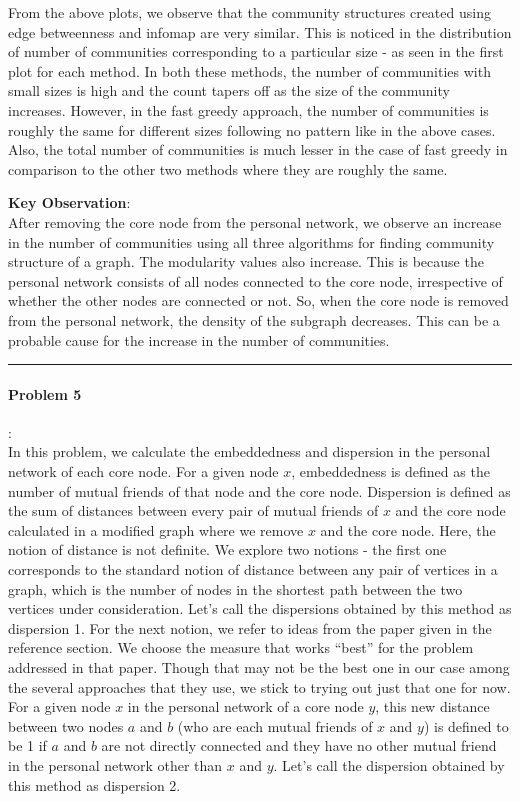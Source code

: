 \documentclass{article}
\begin{document}
From the above plots, we observe that the community structures created using edge betweenness and infomap are very similar. This is 
noticed in the distribution of number of communities corresponding to a particular size - as seen in the first plot for each method. In both these methods, the number
of communities with small sizes is high and the count tapers off as the size of the community increases. However, in the fast greedy approach,
the number of communities is roughly the same for different sizes following no pattern like in the above cases. Also, the total number of communities
is much lesser in the case of fast greedy in comparison to the other two methods where they are roughly the same.  

\textbf{Key Observation}:\\
After removing the core node from the personal network, we observe an increase in the number of 
communities using all three algorithms for finding community structure of a graph. The modularity values 
also increase. This is because the personal network consists of all nodes connected to the core node, irrespective 
of whether the other nodes are connected or not. So, when the core node is removed from the personal network, the 
density of the subgraph decreases. This 
can be a probable cause for the increase in the number of communities.

\hrule

\paragraph{Problem 5}:\\
In this problem, we calculate the embeddedness and dispersion in the personal network of each core node. For 
a given node $x$, embeddedness is defined as the number of mutual friends of that node and the core node.
Dispersion is defined as the sum of distances between every pair of mutual friends of $x$ and the core node
calculated in a modified graph where we remove $x$ and the core node.
Here, the notion of distance is not definite. We explore two notions - the first one corresponds to the
standard notion of distance between any pair of vertices in a graph, which is the number of nodes in the shortest
path between the two vertices under consideration. Let's call the dispersions obtained by this method as 
dispersion 1.
For the next notion, we refer to ideas from the paper given in the reference section.
We choose the measure that works ``best'' for the problem addressed in that paper. Though that may not be the
best one in our case among the several approaches that they use, we stick to trying out just that one for now.
For a given node $x$ in the personal network of a core node $y$, this new distance 
between two nodes $a$ and $b$ (who are each mutual friends of $x$ and $y$) is defined to 
be 1 if $a$ and $b$ are not directly connected and they have no other mutual friend 
in the personal network other than $x$ and $y$. Let's call the dispersion obtained by this method as dispersion 2.\\
\end{document}
